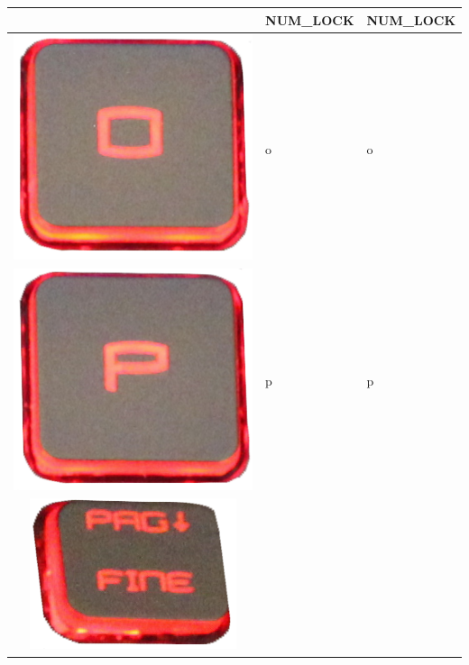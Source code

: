 \begin{longtable}{|cll|}
\begin{minipage}[c]{.3\textwidth}
\vspace{0.2cm}
\end{minipage} & NUM\_LOCK & NUM\_LOCK\\
\hline
\begin{minipage}[c]{.3\textwidth}
\vspace{0.2cm}
\includegraphics[scale=0.06]{Images/KeyMapping/o}
\vspace{0.2cm}
\end{minipage} & o & o\\
\hline
\begin{minipage}[c]{.3\textwidth}
\vspace{0.2cm}
\includegraphics[scale=0.06]{Images/KeyMapping/p}
\vspace{0.2cm}
\end{minipage} & p & p\\
\hline
\begin{minipage}[c]{.3\textwidth}
\vspace{0.2cm}
\includegraphics[scale=0.06]{Images/KeyMapping/PAGE_DOWN}

\end{minipage}
\end{longtable}
